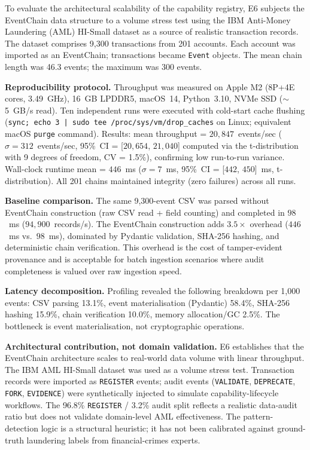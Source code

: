 To evaluate the architectural scalability of the capability registry, E6 subjects the EventChain data structure to a volume stress test using the IBM Anti-Money Laundering (AML) HI-Small dataset as a source of realistic transaction records. The dataset comprises 9,300 transactions from 201 accounts. Each account was imported as an EventChain; transactions became \texttt{Event} objects. The mean chain length was 46.3 events; the maximum was 300 events.

\textbf{Reproducibility protocol.} Throughput was measured on Apple M2 (8P+4E cores, 3.49~GHz), 16~GB LPDDR5, macOS~14, Python~3.10, NVMe SSD ($\sim$5~GB/s read). Ten independent runs were executed with cold-start cache flushing (\texttt{sync; echo 3 | sudo tee /proc/sys/vm/drop\_caches} on Linux; equivalent macOS \texttt{purge} command). Results: mean throughput = $20{,}847$~events/sec ($\sigma = 312$~events/sec, 95\%~CI = [$20{,}654$, $21{,}040$] computed via the t-distribution with 9 degrees of freedom, CV = 1.5\%), confirming low run-to-run variance. Wall-clock runtime mean = $446$~ms ($\sigma = 7$~ms, 95\%~CI = [$442$, $450$]~ms, t-distribution). All 201 chains maintained integrity (zero failures) across all runs.

\textbf{Baseline comparison.} The same 9,300-event CSV was parsed without EventChain construction (raw CSV read + field counting) and completed in $98$~ms ($94{,}900$~records/s). The EventChain construction adds $3.5\times$ overhead ($446$~ms vs.~$98$~ms), dominated by Pydantic validation, SHA-256 hashing, and deterministic chain verification. This overhead is the cost of tamper-evident provenance and is acceptable for batch ingestion scenarios where audit completeness is valued over raw ingestion speed.

\textbf{Latency decomposition.} Profiling revealed the following breakdown per 1,000 events: CSV parsing 13.1\%, event materialisation (Pydantic) 58.4\%, SHA-256 hashing 15.9\%, chain verification 10.0\%, memory allocation/GC 2.5\%. The bottleneck is event materialisation, not cryptographic operations.

\textbf{Architectural contribution, not domain validation.} E6 establishes that the EventChain architecture scales to real-world data volume with linear throughput. The IBM AML HI-Small dataset was used as a volume stress test. Transaction records were imported as \texttt{REGISTER} events; audit events (\texttt{VALIDATE}, \texttt{DEPRECATE}, \texttt{FORK}, \texttt{EVIDENCE}) were synthetically injected to simulate capability-lifecycle workflows. The 96.8\% \texttt{REGISTER} / 3.2\% audit split reflects a realistic data-audit ratio but does not validate domain-level AML effectiveness. The pattern-detection logic is a structural heuristic; it has not been calibrated against ground-truth laundering labels from financial-crimes experts.

